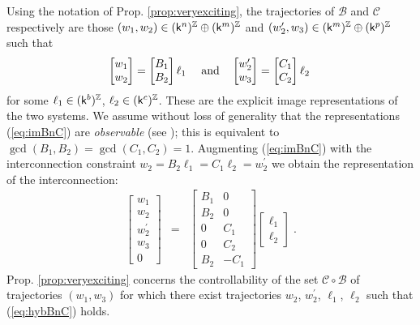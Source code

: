 Using the notation of Prop. \ref{prop:veryexciting}, the trajectories of
$\mathscr{B}$ and $\mathscr{C}$ respectively are those $(w_1,w_2) \in (\mathsf{k}^n)^{\mathbb Z}
\oplus (\mathsf{k}^m)^{\mathbb Z}$ and $(w_2',w_3) \in (\mathsf{k}^m)^{\mathbb Z} \oplus (\mathsf{k}^p)^{\mathbb Z}$ such that 
\begin{equation}\label{eq:imBnC}
\begin{bmatrix} w_1\\w_2 \end{bmatrix}
=
\begin{bmatrix} B_1\\B_2 \end{bmatrix} \ell_1 
\quad \mbox{ \rm and} \quad  
\begin{bmatrix} w_2^\prime\\w_3 \end{bmatrix}
=
\begin{bmatrix} C_1\\C_2 \end{bmatrix} \ell_2\; 
\end{equation}
for some $\ell_1 \in (\mathsf{k}^b)^{\mathbb Z}$, $\ell_2 \in (\mathsf{k}^c)^{\mathbb Z}$. These are the explicit
image representations of the two systems.  We assume without loss
of generality that the representations (\ref{eq:imBnC}) are \emph{observable}
(see \cite{Wi}); this is equivalent to $\gcd(B_1,B_2)=\gcd(C_1,C_2)=1$. Augmenting
(\ref{eq:imBnC}) with the interconnection constraint
$w_2=B_2\ell_1=C_1\ell_2=w_2^\prime$ we obtain the representation of the
interconnection: 
\begin{eqnarray}\label{eq:hybBnC}
\begin{bmatrix}
w_1\\w_2\\w_2^\prime\\w_3\\0
\end{bmatrix}&=&\begin{bmatrix} B_1&0\\B_2&0\\0&C_1\\ 0&C_2 \\ B_2&-C_1 \end{bmatrix} \begin{bmatrix} \ell_1\\\ell_2\end{bmatrix}\; .
\end{eqnarray}
Prop. \ref{prop:veryexciting} concerns the controllability of the set
$\mathscr{C} \circ \mathscr{B}$ of trajectories $(w_1,w_3)$ for which there
exist trajectories $w_2$, $w_2^\prime$, $\ell_1$, $\ell_2$ such that
(\ref{eq:hybBnC}) holds. 

